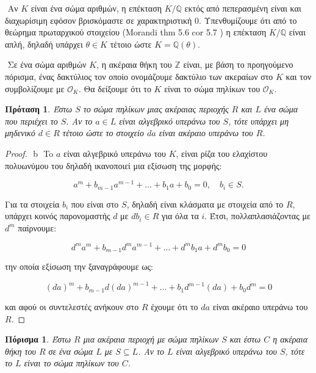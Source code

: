 \documentclass[oneside,a4paper]{article}
\newtheorem{prop}{Πρόταση}
\newtheorem{cor}{Πόρισμα}
\newcommand {\tl}{\textlatin}
\newcommand{\Z}{\mathbb{Z}}
\newcommand{\Q}{\mathbb{Q}}
\begin{document}
$ $\newline
\noindent Αν $K$ είναι ένα σώμα αριθμών, η επέκταση $K/\Q$ εκτός από πεπερασμένη είναι και διαχωρίσιμη εφόσον βρισκόμαστε σε χαρακτηριστική $0$. Υπενθυμίζουμε ότι από το θεώρημα πρωταρχικού στοιχείου (\tl{Morandi thm 5.6 cor 5.7 }) η επέκταση $K/\Q$ είναι απλή, δηλαδή υπάρχει $\theta \in K$ τέτοιο ώστε $K=\Q (\theta)$.


$ $\newline
\noindent Σε ένα σώμα αριθμών $K$, η ακέραια θήκη του $\Z$ είναι, με βάση το προηγούμενο πόρισμα, ένας δακτύλιος τον οποίο ονομάζουμε δακτύλιο των ακεραίων στο $K$ και τον συμβολίζουμε με $\mathcal{O}_K$. Θα δείξουμε ότι το $K$ είναι το σώμα πηλίκων του $\mathcal{O}_K$.



\begin{prop}
	Έστω $S$ το σώμα πηλίκων μιας ακέραιας περιοχής $R$ και $L$ ένα σώμα που περιέχει το $S$. Αν το $a \in L$ είναι αλγεβρικό υπεράνω του $S$, τότε υπάρχει μη μηδενικό $d \in R$ τέτοιο ώστε το στοιχείο $da$ είναι ακέραιο υπεράνω του $R$.
\end{prop}

\begin{proof} $ $
b
	$ $\newline
	To $a$ είναι αλγεβρικό υπεράνω του $K$, είναι ρίζα του ελαχίστου πολυωνύμου του δηλαδή ικανοποιεί μια εξίσωση της μορφής:

	$$a^m + b_{m-1} a^{m-1} + \ldots + b_1 a + b_0 = 0, \quad b_i \in S.$$

	Για τα στοιχεία $b_i$ που είναι στο $S$, δηλαδή είναι κλάσματα με στοιχεία από το $R$, υπάρχει κοινός παρονομαστής $d$ με $db_i \in R$ για όλα τα $i$. Έτσι, πολλαπλασιάζοντας με $d^m$ παίρνουμε:

	$$d^m a^m + b_{m-1} d^m a^{m-1} + \ldots + d^m b_1 a + d^m b_0 = 0$$

	την οποία εξίσωση την ξαναγράφουμε ως:

	$$(da)^m + b_{m-1}d (da)^{m-1} + \ldots + b_1 d^{m-1} (da) + b_0 d^m = 0$$

	και αφού οι συντελεστές ανήκουν στο $R$ έχουμε ότι το $da$ είναι ακέραιο υπεράνω του $R$.
\end{proof}


\begin{cor} Έστω $R$ μια ακέραια περιοχή με σώμα πηλίκων $S$ και έστω $C$ η ακέραια θήκη του $R$ σε ένα σώμα $L$ με $S \subseteq L$. Αν το $L$ είναι αλγεβρικό υπεράνω του $S$, τότε το $L$ είναι το σώμα πηλίκων του $C$.
\end{cor}
\end{document}
